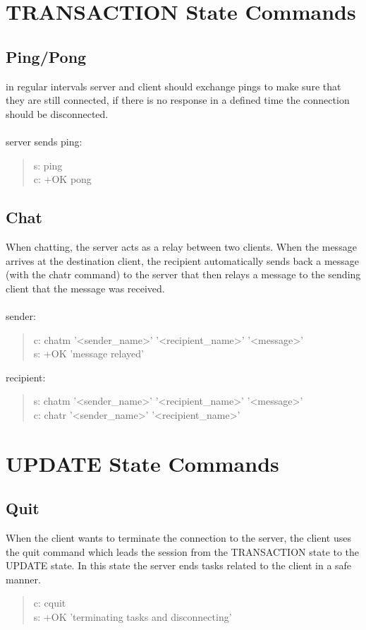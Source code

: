 \documentclass[a4paper,11pt]{article}
\begin{document}
\clearpage
\section{TRANSACTION State Commands}
\subsection{Ping/Pong}
in regular intervals server and client should exchange pings to make sure that they are still connected, if there is no response in a defined time the connection should be disconnected.\\\\
\noindent
server sends ping:
\begin{quote}
  s: ping\\
  c: +OK pong
\end{quote}



\subsection{Chat}
When chatting, the server acts as a relay between two clients. When the message arrives at the destination client, the recipient automatically sends back a message (with the chatr command) to the server that then relays a message to the sending client that the message was received.\\\\
sender:
\begin{quote}
  c: chatm '<sender\_name>' '<recipient\_name>' '<message>'\\ %
  s: +OK 'message relayed'
\end{quote}
\noindent
recipient:
\begin{quote}
    s: chatm '<sender\_name>' '<recipient\_name>' '<message>'\\
  c: chatr '<sender\_name>' '<recipient\_name>'%
\end{quote}
\clearpage
\section{UPDATE State Commands}
\subsection{Quit}
When the client wants to terminate the connection to the server, the client uses the quit command which leads the session from the TRANSACTION state to the UPDATE state. In this state the server ends tasks related to the client in a safe manner.

\begin{quote}
  c: cquit\\
  s: +OK 'terminating tasks and disconnecting'
\end{quote}
\end{document}
